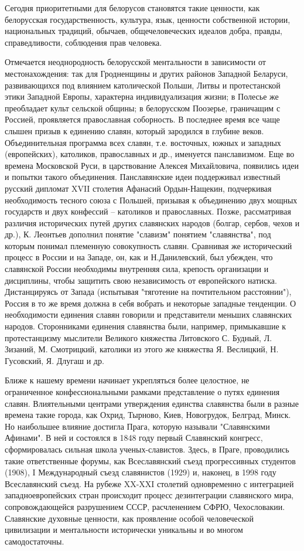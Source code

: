 Сегодня приоритетными для белорусов становятся такие ценности, как белорусская государственность, культура, язык, ценности собственной истории, национальных традиций, обычаев, общечеловеческих идеалов добра, правды, справедливости, соблюдения прав человека.

Отмечается неоднородность белорусской ментальности в зависимости от местонахождения: так для Гродненщины и других районов Западной Беларуси, развивающихся под влиянием католической Польши, Литвы и протестанской этики Западной Европы, характерна индивидуализация жизни; в Полесье же преобладает культ сельской общины; в белорусском Поозерье, граничащим с Россией, проявляется православная соборность.
В последнее время все чаще слышен призыв к единению славян, который зародился в глубине веков. Объединительная программа всех славян, т.е. восточных, южных и западных (европейских), католиков, православных и др., именуется панславизмом. Еще во времена Московской Руси, в царствование Алексея Михайловича, появились идеи и попытки такого объединения. Панславянские идеи поддерживал известный русский дипломат XVII столетия Афанасий Ордын-Нащекин, подчеркивая необходимость тесного союза с Польшей, призывая к объединению двух мощных государств и двух конфессий – католиков и православных. Позже, рассматривая различия исторических путей других славянских народов (болгар, сербов, чехов и др.), К. Леонтьев дополнил понятие "славизм" понятием "славянства", под которым понимал племенную совокупность славян. Сравнивая же исторический процесс в России и на Западе, он, как и Н.Данилевский, был убежден, что славянской России необходимы внутренняя сила, крепость организации и дисциплины, чтобы защитить свою независимость от европейского натиска. Дистанцируясь от Запада (испытывая "тяготение на почтительном расстоянии"), Россия в то же время должна в себя вобрать и некоторые западные тенденции.
О необходимости единения славян говорили и представители меньших славянских народов. Сторонниками единения славянства были, например, примыкавшие к протестанцизму мыслители Великого княжества Литовского С. Будный, Л. Зизаний, М. Смотрицкий, католики из этого же княжества Я. Веслицкий, Н. Гусовский, Я. Длугаш и др.

Ближе к нашему времени начинает укрепляться более целостное, не ограниченное конфессиональными рамками представление о путях единения славян. Влиятельными центрами утверждения единства славянства были в разные времена такие города, как Охрид, Тырново, Киев, Новогрудок, Белград, Минск. Но наибольшее влияние достигла Прага, которую называли "Славянскими Афинами". В ней и состоялся в 1848 году первый Славянский конгресс, сформировалась сильная школа ученых-славистов. Здесь, в Праге, проводились такие ответственные форумы, как Всеславянский съезд прогрессивных студентов (1908), I Международный съезд славянистов (1929) и, наконец, в 1998 году Всеславянский съезд.
На рубеже XX-XXI столетий одновременно с интеграцией западноевропейских стран происходит процесс дезинтеграции славянского мира, сопровождающейся разрушением СССР, расчленением СФРЮ, Чехословакии. Славянские духовные ценности, как проявление особой человеческой цивилизации и ментальности исторически уникальны и во многом самодостаточны.

